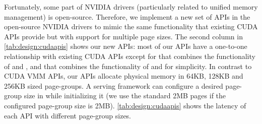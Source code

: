 Fortunately, some part of NVIDIA drivers (particularly related to unified memory management) is open-source. Therefore, we implement a new set of APIs in the open-source NVIDIA drivers to mimic the same functionality that existing CUDA APIs provide but with support for multiple page sizes. The second column in \autoref{tab:design:cudaapis} shows our new APIs: most of our APIs have a one-to-one relationship with existing CUDA APIs except for \vmemmap that combines the functionality of \cumemmap and \cumemsetaccess, and \vmemrelease that combines the functionality of \cumemunmap and \cumemrelease for simplicity. In contrast to CUDA VMM APIs, our APIs allocate physical memory in 64KB, 128KB and 256KB sized page-groups. A serving framework can configure a desired page-group size in \sysname while initializing it (we use the standard 2MB pages if the configured page-group size is 2MB). \autoref{tab:design:cudaapis} shows the latency of each API with different page-group sizes.
